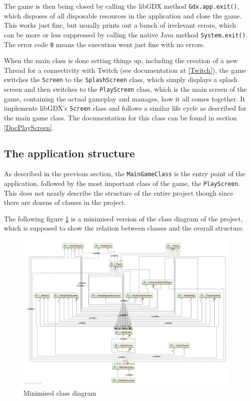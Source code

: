 \documentclass[12p]{article}
\begin{document}
The game is then being closed by calling the libGDX method \texttt{Gdx.app.exit()}, which disposes of all disposable resources in the application and close the game. This works just fine, but usually prints out a bunch of irrelevant errors, which can be more or less suppressed by calling the native Java method \texttt{System.exit()}. The error code \texttt{0} means the execution went just fine with no errors.

When the main class is done setting things up, including the creation of a new Thread for a connectivity with Twitch (see documentation at \ref{Twitch}), the game switches the \texttt{Screen} to the \texttt{SplashScreen} class, which simply displays a splash screen and then switches to the \texttt{PlayScreen} class, which is the main screen of the game, containing the actual gameplay and manages, how it all comes together. It implements libGDX's \texttt{Screen} class and follows a similar life cycle as described for the main game class. The documentation for this class can be found in section \ref{DocPlayScreen}.


\newpage
\subsection{The application structure} \label{DocApplicationStructure}

As described in the previous section, the \texttt{MainGameClass} is the entry point of the application, followed by the most important class of the game, the \texttt{PlayScreen}. This does not nearly describe the structure of the entire project though since there are dozens of classes in the project.

The following figure \ref{fig:minClassDiagram} is a minimised version of the class diagram of the project, which is supposed to show the relation between classes and the overall structure.

\begin{figure}[ht]
  \centering
  \includegraphics[width=1\textwidth]{Documentation/class_diagram_minimized.png}
  \caption{Minimised class diagram}
  \label{fig:minClassDiagram}
\end{figure}
\end{document}
